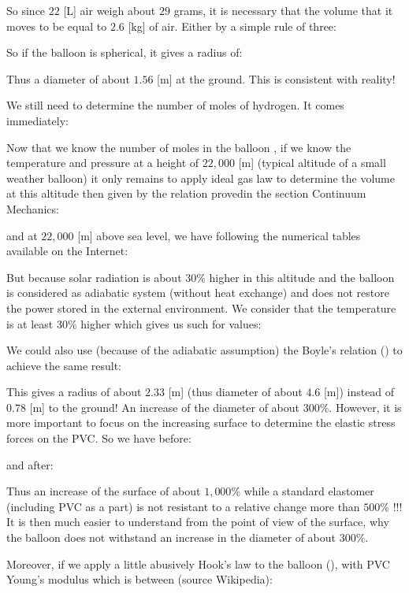 	So since $22$ [L] air weigh about $29$ grams, it is necessary that the volume that it moves to be equal to $2.6$ [kg] of air. Either by a simple rule of three:
	
	So if the balloon is spherical, it gives a radius of:
	
	Thus a diameter of about $1.56$ [m] at the ground. This is consistent with reality!

	We still need to determine the number of moles of hydrogen. It comes immediately:
	
	Now that we know the number of moles in the balloon , if we know the temperature and pressure at a height of $22,000$ [m] (typical altitude of a small weather balloon) it only remains to apply ideal gas law to determine the volume at this altitude then given by the relation provedin the section Continuum Mechanics:
	
	and at $22,000$ [m] above sea level, we have following the numerical tables available on the Internet:
	
	But because solar radiation is about $30\%$ higher in this altitude and the balloon is considered as adiabatic system (without heat exchange) and does not restore the power stored in the external environment. We consider that the temperature is at least $30\%$ higher which gives us such for values:
	
	
	We could also use (because of the adiabatic assumption) the Boyle's relation () to achieve the same result:
	
	This gives a radius of about $2.33$ [m] (thus diameter  of about $4.6$ [m]) instead of $0.78$ [m] to the ground! An increase of the diameter of about $300\%$. However, it is more important to focus on the increasing surface to determine the elastic stress forces on the PVC. So we have before:
	
	and after:
	
	Thus an increase of the surface of about $1,000\%$ while a standard elastomer (including PVC as a part) is not resistant to a relative change more than $500\%$ !!! It is then much easier to understand from the point of view of the surface, why the balloon does not withstand an increase in the diameter of about $300\%$.

	Moreover, if we apply a little abusively Hook's law to the balloon (), with PVC Young's modulus which is between (source Wikipedia):
	
